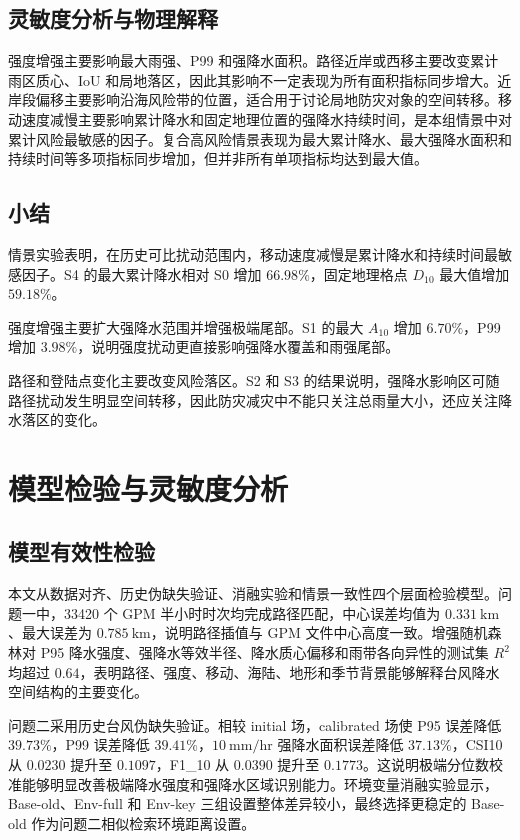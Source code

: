 \documentclass[UTF8,a4paper,zihao=5,fontset=fandol]{ctexart}
\numberwithin{equation}{section}
\numberwithin{figure}{section}
\numberwithin{table}{section}
\begin{document}
\subsection{灵敏度分析与物理解释}

强度增强主要影响最大雨强、P99 和强降水面积。路径近岸或西移主要改变累计雨区质心、IoU 和局地落区，因此其影响不一定表现为所有面积指标同步增大。近岸段偏移主要影响沿海风险带的位置，适合用于讨论局地防灾对象的空间转移。移动速度减慢主要影响累计降水和固定地理位置的强降水持续时间，是本组情景中对累计风险最敏感的因子。复合高风险情景表现为最大累计降水、最大强降水面积和持续时间等多项指标同步增加，但并非所有单项指标均达到最大值。

\subsection{小结}

情景实验表明，在历史可比扰动范围内，移动速度减慢是累计降水和持续时间最敏感因子。S4 的最大累计降水相对 S0 增加 $66.98\%$，固定地理格点 $D_{10}$ 最大值增加 $59.18\%$。

强度增强主要扩大强降水范围并增强极端尾部。S1 的最大 $A_{10}$ 增加 $6.70\%$，P99 增加 $3.98\%$，说明强度扰动更直接影响强降水覆盖和雨强尾部。

路径和登陆点变化主要改变风险落区。S2 和 S3 的结果说明，强降水影响区可随路径扰动发生明显空间转移，因此防灾减灾中不能只关注总雨量大小，还应关注降水落区的变化。

\section{模型检验与灵敏度分析}

\subsection{模型有效性检验}
本文从数据对齐、历史伪缺失验证、消融实验和情景一致性四个层面检验模型。问题一中，33420 个 GPM 半小时时次均完成路径匹配，中心误差均值为 $0.331\ \mathrm{km}$、最大误差为 $0.785\ \mathrm{km}$，说明路径插值与 GPM 文件中心高度一致。增强随机森林对 P95 降水强度、强降水等效半径、降水质心偏移和雨带各向异性的测试集 $R^2$ 均超过 $0.64$，表明路径、强度、移动、海陆、地形和季节背景能够解释台风降水空间结构的主要变化。

问题二采用历史台风伪缺失验证。相较 initial 场，calibrated 场使 P95 误差降低 $39.73\%$，P99 误差降低 $39.41\%$，$10\ \mathrm{mm/hr}$ 强降水面积误差降低 $37.13\%$，CSI10 从 $0.0230$ 提升至 $0.1097$，F1\_10 从 $0.0390$ 提升至 $0.1773$。这说明极端分位数校准能够明显改善极端降水强度和强降水区域识别能力。环境变量消融实验显示，Base-old、Env-full 和 Env-key 三组设置整体差异较小，最终选择更稳定的 Base-old 作为问题二相似检索环境距离设置。
\end{document}
